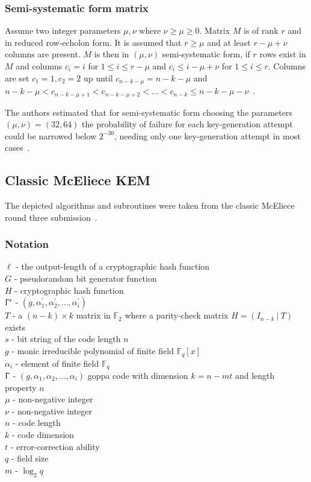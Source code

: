 \documentclass[11pt,
  oneside,openany,    %
]{scrreprt}
\begin{document}
\subsubsection{Semi-systematic form matrix}
Assume two integer parameters $\mu, \nu$ where $\nu \geq \mu \geq 0$. Matrix $M$ is of rank $r$ and in reduced row-echolon form. It is assumed that $r \geq \mu$ and at least $r-\mu+\nu$  columns are present.
$M$ is then in $(\mu, \nu)$ semi-systematic form, if $r$ rows exist in $M$ and columns $c_{i} = i$ for $1 \leq i \leq r-\mu$ and $c_{i} \leq i-\mu+\nu$ for $1 \leq i \leq r$.
Columns are set $c_{1} = 1, c_{2} = 2$ up until $c_{n-k-\mu} = n-k-\mu$ and $n-k-\mu < c_{n-k-\mu+1} < c_{n-k-\mu+2} < ... < c_{n-k} \leq n-k-\mu-\nu$~\cite{classicMcElieceSubmission3}.

The authors estimated that for semi-systematic form choosing the parameters $(\mu, \nu) = (32, 64)$ the probability of failure for each key-generation attempt could be narrowed below $2^{-30}$, needing only one key-generation attempt in most cases~\cite{classicMcElieceSubmission3}.

\pagebreak

\subsection{Classic McEliece KEM}
The depicted algorithms and subroutines were taken from the classic McEliece round three submission~\cite{classicMcElieceSubmission3}.

\subsubsection{Notation}
$\ell$ - the output-length of a cryptographic hash function\\
$G$ - pseudorandom bit generator function\\
$H$ - cryptographic hash function\\
$\Upgamma^{\prime}$ - $(g, \alpha^{\prime}_{1}, \alpha^{\prime}_{2},..., \alpha^{\prime}_{i})$\\
$T$ - a $(n-k) \times k$ matrix in $\mathbb{F}_{2}$ where a parity-check matrix $H = (I_{n-k} \ | \ T)$ exists\\
$s$ - bit string of the code length $n$\\
$g$ - monic irreducible polynomial of finite field $\mathbb{F}_{q}[x]$\\
$\alpha_{i}$ - element of finite field $\mathbb{F}_{q}$\\
$\Upgamma$ - $(g, \alpha_{1}, \alpha_{2},..., \alpha_{i})$ goppa code with dimension $k = n - mt$ and length property $n$\\
$\mu$ - non-negative integer\\
$\nu$ - non-negative integer\\
$n$ - code length\\
$k$ - code dimension\\
$t$ - error-correction ability\\
$q$ - field size\\
$m$ - $\log_{2}q$
\end{document}
